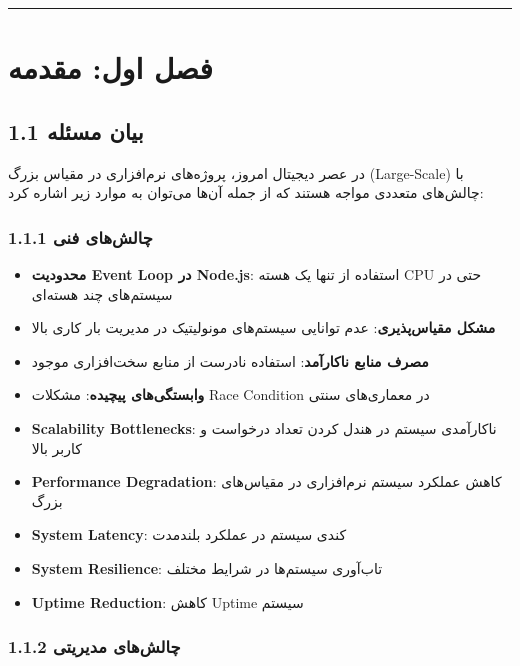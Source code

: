 \documentclass[
]{article}
\providecommand{\tightlist}{%
  \setlength{\itemsep}{0pt}\setlength{\parskip}{0pt}}
\begin{document}
\begin{center}\rule{0.5\linewidth}{0.5pt}\end{center}

\section{فصل اول:
مقدمه}\label{ux641ux635ux644-ux627ux648ux644-ux645ux642ux62fux645ux647}

\subsection{1.1 بیان
مسئله}\label{ux628ux6ccux627ux646-ux645ux633ux626ux644ux647}

در عصر دیجیتال امروز، پروژه‌های نرم‌افزاری در مقیاس بزرگ (Large-Scale) با
چالش‌های متعددی مواجه هستند که از جمله آن‌ها می‌توان به موارد زیر اشاره
کرد:

\subsubsection{1.1.1 چالش‌های
فنی}\label{ux686ux627ux644ux634ux647ux627ux6cc-ux641ux646ux6cc}

\begin{itemize}
\tightlist
\item
  \textbf{محدودیت Event Loop در Node.js}: استفاده از تنها یک هسته CPU
  حتی در سیستم‌های چند هسته‌ای
\item
  \textbf{مشکل مقیاس‌پذیری}: عدم توانایی سیستم‌های مونولیتیک در مدیریت بار
  کاری بالا
\item
  \textbf{مصرف منابع ناکارآمد}: استفاده نادرست از منابع سخت‌افزاری موجود
\item
  \textbf{وابستگی‌های پیچیده}: مشکلات Race Condition در معماری‌های سنتی
\item
  \textbf{Scalability Bottlenecks}: ناکارآمدی سیستم در هندل کردن تعداد
  درخواست و کاربر بالا
\item
  \textbf{Performance Degradation}: کاهش عملکرد سیستم نرم‌افزاری در
  مقیاس‌های بزرگ
\item
  \textbf{System Latency}: کندی سیستم در عملکرد بلندمدت
\item
  \textbf{System Resilience}: تاب‌آوری سیستم‌ها در شرایط مختلف
\item
  \textbf{Uptime Reduction}: کاهش Uptime سیستم
\end{itemize}

\subsubsection{1.1.2 چالش‌های
مدیریتی}\label{ux686ux627ux644ux634ux647ux627ux6cc-ux645ux62fux6ccux631ux6ccux62aux6cc}
\end{document}
